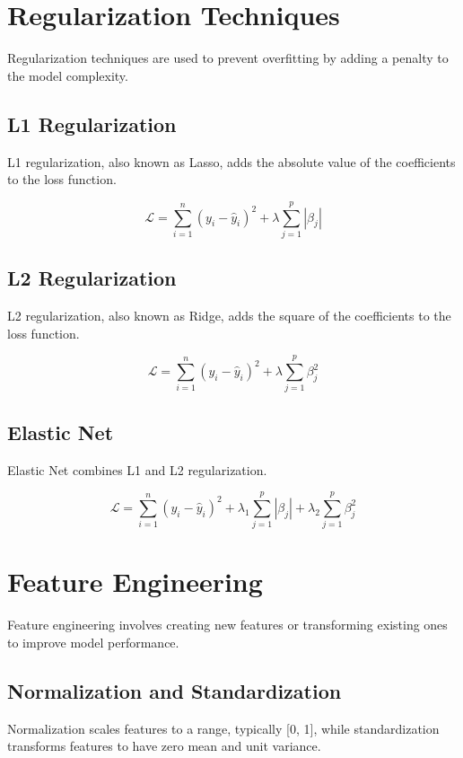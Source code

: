 \section{Regularization Techniques}
Regularization techniques are used to prevent overfitting by adding a penalty to the model complexity.

\subsection{L1 Regularization}
L1 regularization, also known as Lasso, adds the absolute value of the coefficients to the loss function.

\begin{equation}
\mathcal{L} = \sum_{i=1}^n (y_i - \hat{y}_i)^2 + \lambda \sum_{j=1}^p |\beta_j|
\end{equation}

\subsection{L2 Regularization}
L2 regularization, also known as Ridge, adds the square of the coefficients to the loss function.

\begin{equation}
\mathcal{L} = \sum_{i=1}^n (y_i - \hat{y}_i)^2 + \lambda \sum_{j=1}^p \beta_j^2
\end{equation}

\subsection{Elastic Net}
Elastic Net combines L1 and L2 regularization.

\begin{equation}
\mathcal{L} = \sum_{i=1}^n (y_i - \hat{y}_i)^2 + \lambda_1 \sum_{j=1}^p |\beta_j| + \lambda_2 \sum_{j=1}^p \beta_j^2
\end{equation}

\section{Feature Engineering}
Feature engineering involves creating new features or transforming existing ones to improve model performance.

\subsection{Normalization and Standardization}
Normalization scales features to a range, typically [0, 1], while standardization transforms features to have zero mean and unit variance.

